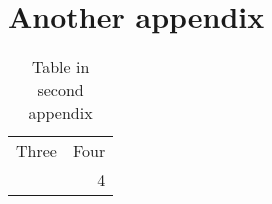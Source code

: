 \documentclass{mpi-aebr}
\begin{document}
\section{Another appendix}

\begin{table}[h]
\caption{Table in second appendix}
\begin{center}
\fontsize{10}{12}\selectfont
\begin{tabular}{rr}
Three & Four \\ \addlinespace
3 & 4
\end{tabular}
\end{center}
\end{table}

\end{document}

